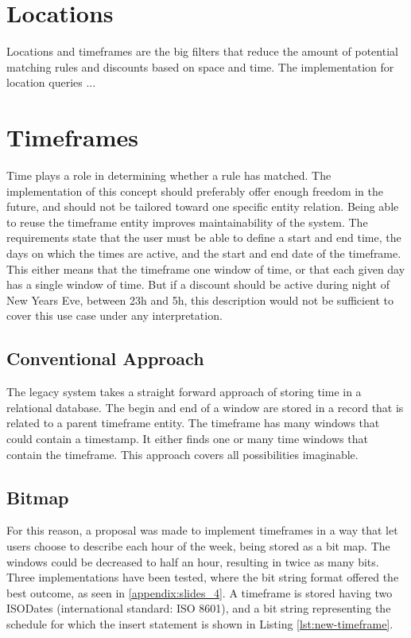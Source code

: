 \section{Locations}
Locations and timeframes are the big filters that reduce the amount of potential matching rules and discounts based on space and time. The implementation for location queries ...

\section{Timeframes}
Time plays a role in determining whether a rule has matched. The implementation of this concept should preferably offer enough freedom in the future, and should not be tailored toward one specific entity relation. Being able to reuse the timeframe entity improves maintainability of the system. The requirements state that the user must be able to define a start and end time, the days on which the times are active, and the start and end date of the timeframe. This either means that the timeframe one window of time, or that each given day has a single window of time. But if a discount should be active during night of New Years Eve, between 23h and 5h, this description would not be sufficient to cover this use case under any interpretation.

\subsection{Conventional Approach}
The legacy system takes a straight forward approach of storing time in a relational database. The begin and end of a window are stored in a record that is related to a parent timeframe entity. The timeframe has many windows that could contain a timestamp. It either finds one or many time windows that contain the timeframe. This approach covers all possibilities imaginable.

\subsection{Bitmap}
For this reason, a proposal was made to implement timeframes in a way that let users choose to describe each hour of the week, being stored as a bit map. The windows could be decreased to half an hour, resulting in twice as many bits. Three implementations have been tested, where the bit string format offered the best outcome, as seen in \ref{appendix:slides_4}. A timeframe is stored having two ISODates (international standard: ISO 8601), and a bit string representing the schedule for which the insert statement is shown in Listing \ref{lst:new-timeframe}.

